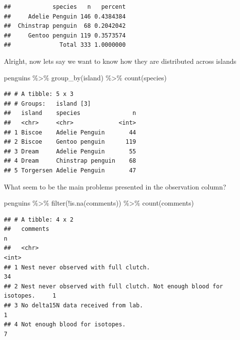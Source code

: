 \documentclass[
]{book}
\newenvironment{Shaded}{\begin{snugshade}}{\end{snugshade}}
\newcommand{\FunctionTok}[1]{\textcolor[rgb]{0.00,0.00,0.00}{#1}}
\newcommand{\NormalTok}[1]{#1}
\newcommand{\SpecialCharTok}[1]{\textcolor[rgb]{0.00,0.00,0.00}{#1}}
\begin{document}
\begin{verbatim}
##            species   n   percent
##     Adelie Penguin 146 0.4384384
##  Chinstrap penguin  68 0.2042042
##     Gentoo penguin 119 0.3573574
##              Total 333 1.0000000
\end{verbatim}

Alright, now lets say we want to know how they are distributed across islands

\begin{Shaded}
\begin{Highlighting}[]
\NormalTok{penguins }\SpecialCharTok{\%\textgreater{}\%} 
  \FunctionTok{group\_by}\NormalTok{(island) }\SpecialCharTok{\%\textgreater{}\%} 
  \FunctionTok{count}\NormalTok{(species)}
\end{Highlighting}
\end{Shaded}

\begin{verbatim}
## # A tibble: 5 x 3
## # Groups:   island [3]
##   island    species               n
##   <chr>     <chr>             <int>
## 1 Biscoe    Adelie Penguin       44
## 2 Biscoe    Gentoo penguin      119
## 3 Dream     Adelie Penguin       55
## 4 Dream     Chinstrap penguin    68
## 5 Torgersen Adelie Penguin       47
\end{verbatim}

What seem to be the main problems presented in the observation column?

\begin{Shaded}
\begin{Highlighting}[]
\NormalTok{penguins }\SpecialCharTok{\%\textgreater{}\%}
  \FunctionTok{filter}\NormalTok{(}\SpecialCharTok{!}\FunctionTok{is.na}\NormalTok{(comments)) }\SpecialCharTok{\%\textgreater{}\%} 
  \FunctionTok{count}\NormalTok{(comments)}
\end{Highlighting}
\end{Shaded}

\begin{verbatim}
## # A tibble: 4 x 2
##   comments                                                                 n
##   <chr>                                                                <int>
## 1 Nest never observed with full clutch.                                   34
## 2 Nest never observed with full clutch. Not enough blood for isotopes.     1
## 3 No delta15N data received from lab.                                      1
## 4 Not enough blood for isotopes.                                           7
\end{verbatim}
\end{document}
